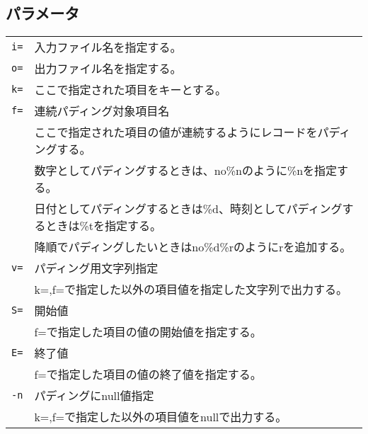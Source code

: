 \subsection*{パラメータ}
\begin{table}[htbp]
{\small
\begin{tabular}{ll}
\verb|i=|    & 入力ファイル名を指定する。\\
\verb|o=|    & 出力ファイル名を指定する。\\
\verb|k=|    & ここで指定された項目をキーとする。\\
\verb|f=|    & 連続パディング対象項目名 \\
             & ここで指定された項目の値が連続するようにレコードをパディングする。\\
			 & 数字としてパディングするときは、no\%nのように\%nを指定する。\\
			 & 日付としてパディングするときは\%d、時刻としてパディングするときは\%tを指定する。\\
			 & 降順でパディングしたいときはno\%d\%rのようにrを追加する。\\
\verb|v=|    & パディング用文字列指定\\
             & k=,f=で指定した以外の項目値を指定した文字列で出力する。\\
\verb|S=|    & 開始値\\
             & f=で指定した項目の値の開始値を指定する。\\
\verb|E=|    & 終了値\\
             & f=で指定した項目の値の終了値を指定する。\\
\verb|-n|    & パディングにnull値指定\\
             & k=,f=で指定した以外の項目値をnullで出力する。\\
\end{tabular} 
}
\end{table} 


